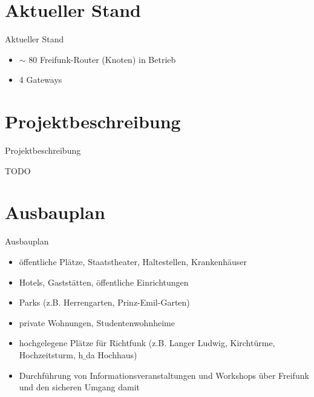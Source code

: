 \documentclass{beamer}
\begin{document}
\section{Aktueller Stand}
\begin{frame}{Aktueller Stand}
\begin{itemize}
	\item $\sim$ 80 Freifunk-Router (Knoten) in Betrieb
	\item 4 Gateways
\end{itemize}
\end{frame}



\section{Projektbeschreibung}
\begin{frame}{Projektbeschreibung}
\begin{center}
TODO
\end{center}
\end{frame}




\section{Ausbauplan}
\begin{frame}{Ausbauplan}
\vfill
\begin{itemize}
	\item öffentliche Plätze, Staatstheater, Haltestellen, Krankenhäuser
	\item Hotels, Gaststätten, öffentliche Einrichtungen
	\item Parks (z.B. Herrengarten, Prinz-Emil-Garten)
	\item private Wohnungen, Studentenwohnheime
	\item hochgelegene Plätze für Richtfunk (z.B. Langer Ludwig, Kirchtürme, Hochzeitsturm, h$\_$da Hochhaus)
\end{itemize}
\vfill
\pause
\begin{itemize}
	\item Durchführung von Informationsveranstaltungen und Workshops über Freifunk und den sicheren Umgang damit
\end{itemize}
\vfill
\end{frame}
\end{document}
